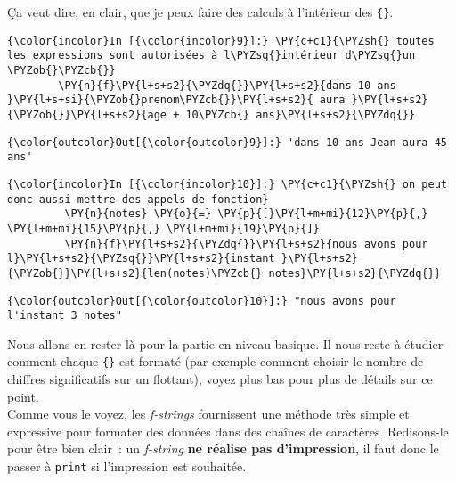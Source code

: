     Ça veut dire, en clair, que je peux faire des calculs à l'intérieur des
\texttt{\{\}}.

    \begin{Verbatim}[commandchars=\\\{\}]
{\color{incolor}In [{\color{incolor}9}]:} \PY{c+c1}{\PYZsh{} toutes les expressions sont autorisées à l\PYZsq{}intérieur d\PYZsq{}un \PYZob{}\PYZcb{}}
        \PY{n}{f}\PY{l+s+s2}{\PYZdq{}}\PY{l+s+s2}{dans 10 ans }\PY{l+s+si}{\PYZob{}prenom\PYZcb{}}\PY{l+s+s2}{ aura }\PY{l+s+s2}{\PYZob{}}\PY{l+s+s2}{age + 10\PYZcb{} ans}\PY{l+s+s2}{\PYZdq{}}
\end{Verbatim}


\begin{Verbatim}[commandchars=\\\{\}]
{\color{outcolor}Out[{\color{outcolor}9}]:} 'dans 10 ans Jean aura 45 ans'
\end{Verbatim}
            
    \begin{Verbatim}[commandchars=\\\{\}]
{\color{incolor}In [{\color{incolor}10}]:} \PY{c+c1}{\PYZsh{} on peut donc aussi mettre des appels de fonction}
         \PY{n}{notes} \PY{o}{=} \PY{p}{[}\PY{l+m+mi}{12}\PY{p}{,} \PY{l+m+mi}{15}\PY{p}{,} \PY{l+m+mi}{19}\PY{p}{]}
         \PY{n}{f}\PY{l+s+s2}{\PYZdq{}}\PY{l+s+s2}{nous avons pour l}\PY{l+s+s2}{\PYZsq{}}\PY{l+s+s2}{instant }\PY{l+s+s2}{\PYZob{}}\PY{l+s+s2}{len(notes)\PYZcb{} notes}\PY{l+s+s2}{\PYZdq{}}
\end{Verbatim}


\begin{Verbatim}[commandchars=\\\{\}]
{\color{outcolor}Out[{\color{outcolor}10}]:} "nous avons pour l'instant 3 notes"
\end{Verbatim}
            
    Nous allons en rester là pour la partie en niveau basique. Il nous reste
à étudier comment chaque \texttt{\{\}} est formaté (par exemple comment
choisir le nombre de chiffres significatifs sur un flottant), voyez plus
bas pour plus de détails sur ce point.\\

Comme vous le voyez, les \emph{f-strings} fournissent une méthode très
simple et expressive pour formater des données dans des chaînes de
caractères. Redisons-le pour être bien clair~: un \emph{f-string}
\textbf{ne réalise pas d'impression}, il faut donc le passer à
\texttt{print} si l'impression est souhaitée.

